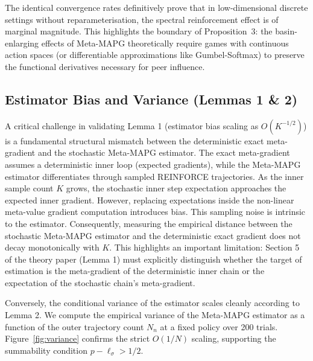 \documentclass[11pt,a4paper]{article}
\theoremstyle{remark}
\begin{document}
The identical convergence rates definitively prove that in low-dimensional discrete settings without reparameterisation, the spectral reinforcement effect is of marginal magnitude. This highlights the boundary of Proposition~3: the basin-enlarging effects of Meta-MAPG theoretically require games with continuous action spaces (or differentiable approximations like Gumbel-Softmax) to preserve the functional derivatives necessary for peer influence.

\subsection{Estimator Bias and Variance (Lemmas 1 \& 2)}
\label{sec:bias_variance}

A critical challenge in validating Lemma 1 (estimator bias scaling as $O(K^{-1/2})$) is a fundamental structural mismatch between the deterministic exact meta-gradient and the stochastic Meta-MAPG estimator. The exact meta-gradient assumes a deterministic inner loop (expected gradients), while the Meta-MAPG estimator differentiates through sampled REINFORCE trajectories. As the inner sample count $K$ grows, the stochastic inner step expectation approaches the expected inner gradient. However, replacing expectations inside the non-linear meta-value gradient computation introduces bias. This sampling noise is intrinsic to the estimator. Consequently, measuring the empirical distance between the stochastic Meta-MAPG estimator and the deterministic exact gradient does not decay monotonically with $K$. This highlights an important limitation: Section 5 of the theory paper (Lemma 1) must explicitly distinguish whether the target of estimation is the meta-gradient of the deterministic inner chain or the expectation of the stochastic chain's meta-gradient.

Conversely, the conditional variance of the estimator scales cleanly according to Lemma 2. We compute the empirical variance of the Meta-MAPG estimator as a function of the outer trajectory count $N_n$ at a fixed policy over 200 trials. Figure~\ref{fig:variance} confirms the strict $O(1/N)$ scaling, supporting the summability condition $p - \ell_\sigma > 1/2$.
\end{document}
